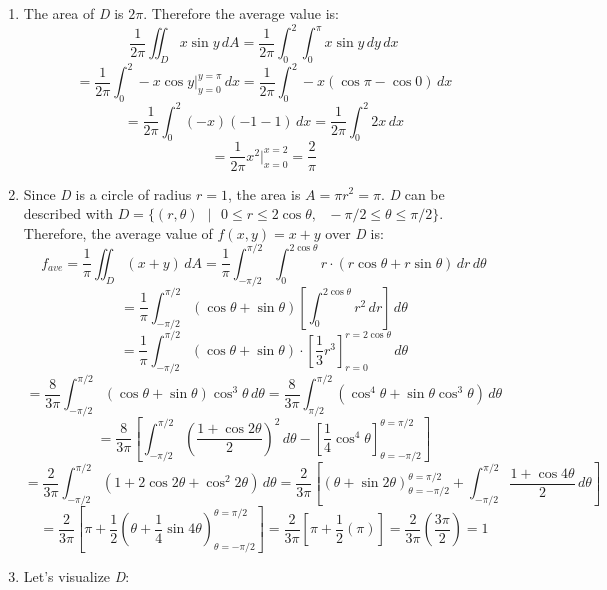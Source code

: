 \begin{Answer}[ref = avg]
\begin{enumerate}
\item The area of \textit{D} is $2\pi$. Therefore the average value is:
$$\frac{1}{2\pi} \iint_{\textit{D}} x\sin{y}\,dA = \frac{1}{2\pi} \int_0^2 
\int_{0}^{\pi} x\sin{y}\,dy\,dx$$
$$= \frac{1}{2\pi} \int_0^2 -x\cos{y}|_{y = 0}^{y = \pi}\,dx = \frac{1}{2\pi} 
\int_0^2 -x \left( \cos{\pi} - \cos{0} \right)\,dx$$
$$= \frac{1}{2\pi} \int_0^2 (-x)(-1 - 1)\,dx = \frac{1}{2\pi} \int_0^2 2x\,dx$$
$$= \frac{1}{2\pi} x^2|_{x = 0}^{x = 2} = \frac{2}{\pi}$$
\item Since \textit{D} is a circle of radius $r = 1$, the area is $A = \pi r^2 
= \pi$. \textit{D} can be described with $\textit{D} = \{ (r, \theta)\text{ }|
\text{ } 0 \leq r \leq 2\cos{\theta},\text{ } -\pi/2 \leq \theta \leq \pi/2\}$.
Therefore, the average value of $f(x, y) = x + y$ over \textit{D} is:
$$f_{ave} = \frac{1}{\pi} \iint_{\textit{D}} \left(x + y \right)\,dA = 
\frac{1}{\pi} \int_{-\pi/2}^{\pi/2} \int_0^{2\cos{\theta}} r \cdot \left(r\cos{
\theta} + r\sin{\theta} \right)\,dr\,d\theta$$
$$= \frac{1}{\pi} \int_{-\pi/2}^{\pi/2} \left(\cos{\theta} + \sin{\theta} 
\right) \left[\int_0^{2\cos{\theta}} r^2 \,dr \right]\,d\theta$$
$$= \frac{1}{\pi} \int_{-\pi/2}^{\pi/2} \left(\cos{\theta} + \sin{\theta} 
\right) \cdot \left[ \frac{1}{3} r^3 \right]_{r = 0}^{r = 2\cos{\theta}}\,d
\theta$$
$$= \frac{8}{3\pi} \int_{-\pi/2}^{\pi/2} \left(\cos{\theta} + \sin{\theta} 
\right) \cos^3{\theta}\,d\theta = \frac{8}{3\pi} \int_{\pi/2}^{\pi/2} \left( 
\cos^4{\theta} + \sin{\theta} \cos^3{\theta} \right)\,d\theta$$
$$= \frac{8}{3\pi} \left[ \int_{-\pi/2}^{\pi/2} \left( \frac{1 + \cos{2
\theta}}{2} \right)^2\,d\theta - \left[ \frac{1}{4} \cos^4{\theta} \right]_{
\theta = -\pi/2}^{\theta = \pi/2} \right]$$
$$= \frac{2}{3\pi} \int_{-\pi/2}^{\pi/2} \left(1 + 2\cos{2\theta} + \cos^2{2
\theta} \right)\,d\theta = \frac{2}{3\pi} \left[ \left(\theta + \sin{2\theta} 
\right)_{\theta = -\pi/2}^{\theta = \pi/2} + \int_{-\pi/2}^{\pi/2} \frac{1 + 
\cos{4\theta}}{2}\,d\theta \right]$$
$$= \frac{2}{3\pi} \left[ \pi + \frac{1}{2} \left(\theta + \frac{1}{4}\sin{4
\theta} \right)_{\theta = -\pi/2}^{\theta = \pi/2} \right] = \frac{2}{3\pi} 
\left[ \pi + \frac{1}{2} \left( \pi \right) \right] = \frac{2}{3\pi} \left( 
\frac{3\pi}{2} \right) = 1$$
\item Let's visualize \textit{D}:



\end{enumerate}
\end{Answer}
